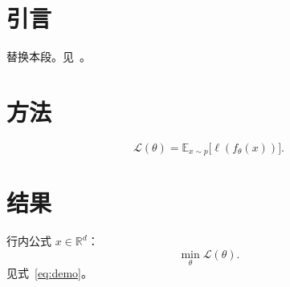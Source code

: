 \section{引言}
\label{sec:intro}

替换本段。见~\cite{rosepine2026}。

\section{方法}

\begin{formulabox}
\[
  \mathcal{L}(\theta) = \mathbb{E}_{x\sim p}\bigl[\ell(f_\theta(x))\bigr].
\]
\end{formulabox}

\section{结果}

行内公式 $x \in \mathbb{R}^d$：
\begin{equation}
  \label{eq:demo}
  \min_{\theta} \mathcal{L}(\theta).
\end{equation}
见式~\eqref{eq:demo}。
